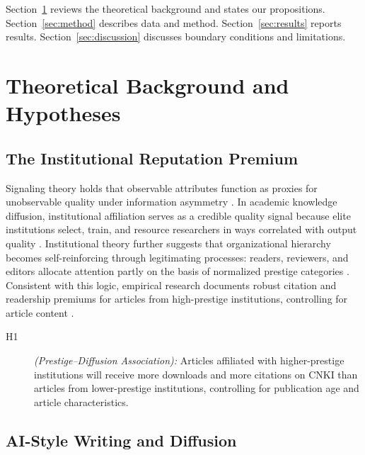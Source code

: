 \documentclass[12pt,a4paper]{article}
\begin{document}
Section~\ref{sec:theory} reviews the theoretical background and states
our propositions.
Section~\ref{sec:method} describes data and method.
Section~\ref{sec:results} reports results.
Section~\ref{sec:discussion} discusses boundary conditions and limitations.

\section{Theoretical Background and Hypotheses}
\label{sec:theory}

\subsection{The Institutional Reputation Premium}

Signaling theory holds that observable attributes function as proxies
for unobservable quality under information asymmetry \citep{Spence1973}.
In academic knowledge diffusion, institutional affiliation serves as a
credible quality signal because elite institutions select, train, and
resource researchers in ways correlated with output quality
\citep{Long1979,Lariviere2010}.
Institutional theory further suggests that organizational hierarchy
becomes self-reinforcing through legitimating processes: readers,
reviewers, and editors allocate attention partly on the basis of
normalized prestige categories \citep{DiMaggio1983}.
Consistent with this logic, empirical research documents robust
citation and readership premiums for articles from high-prestige
institutions, controlling for article content \citep{Wang2013}.
\begin{description}
  \item[H1] \textit{(Prestige--Diffusion Association):}
  Articles affiliated with higher-prestige institutions will receive
  more downloads and more citations on CNKI than articles from
  lower-prestige institutions, controlling for publication age
  and article characteristics.
\end{description}

\subsection{AI-Style Writing and Diffusion}
\end{document}
